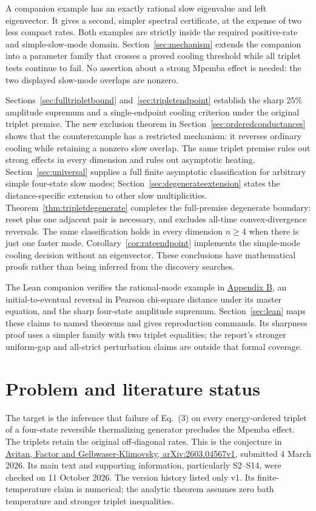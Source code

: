 \documentclass[11pt]{article}
\begin{document}
A companion example has an exactly rational slow eigenvalue and left eigenvector. It gives a second, simpler spectral certificate, at the expense of two less compact rates. Both examples are strictly inside the required positive-rate and simple-slow-mode domain. Section~\ref{sec:mechanism} extends the companion into a parameter family that crosses a proved cooling threshold while all triplet tests continue to fail. No assertion about a strong Mpemba effect is needed: the two displayed slow-mode overlaps are nonzero.

Sections~\ref{sec:fulltripletbound} and~\ref{sec:tripletendpoint} establish the sharp $25\%$ amplitude supremum and a single-endpoint cooling criterion under the original triplet premise. The new exclusion theorem in Section~\ref{sec:orderedconductances} shows that the counterexample has a restricted mechanism: it reverses ordinary cooling while retaining a nonzero slow overlap. The same triplet premise rules out strong effects in every dimension and rules out asymptotic heating. Section~\ref{sec:universal} supplies a full finite asymptotic classification for arbitrary simple four-state slow modes; Section~\ref{sec:degenerateextension} states the distance-specific extension to other slow multiplicities. Theorem~\ref{thm:tripletdegenerate} completes the full-premise degenerate boundary: reset plus one adjacent pair is necessary, and excludes all-time convex-divergence reversals. The same classification holds in every dimension $n\geq4$ when there is just one faster mode. Corollary~\ref{cor:rateendpoint} implements the simple-mode cooling decision without an eigenvector. These conclusions have mathematical proofs rather than being inferred from the discovery searches.

The Lean companion verifies the rational-mode example in \hyperref[app:rational]{Appendix B}, an initial-to-eventual reversal in Pearson chi-square distance under its master equation, and the sharp four-state amplitude supremum. Section~\ref{sec:lean} maps these claims to named theorems and gives reproduction commands. Its sharpness proof uses a simpler family with two triplet equalities; the report's stronger uniform-gap and all-strict perturbation claims are outside that formal coverage.

\section{Problem and literature status}
The target is the inference that failure of Eq.~(3) on every energy-ordered triplet of a four-state reversible thermalizing generator precludes the Mpemba effect. The triplets retain the original off-diagonal rates. This is the conjecture in \href{https://arxiv.org/html/2603.04567v1}{Avitan, Factor and Gelbwaser-Klimovsky, arXiv:2603.04567v1}, submitted 4 March 2026. Its main text and supporting information, particularly S2--S14, were checked on 11 October 2026. The version history listed only v1. Its finite-temperature claim is numerical; the analytic theorem assumes zero bath temperature and stronger triplet inequalities.
\end{document}
